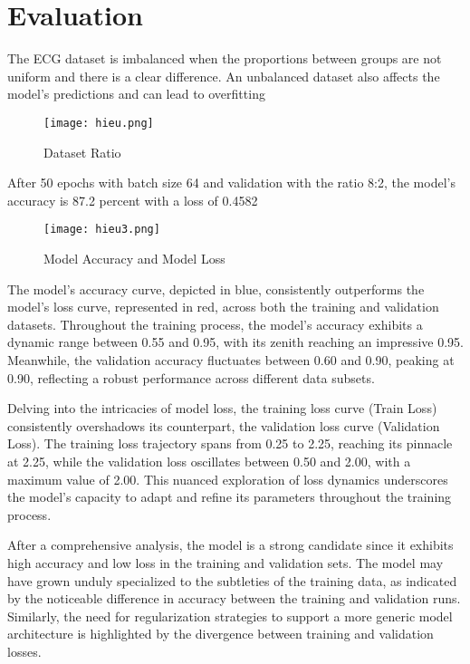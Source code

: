 \documentclass[conference]{IEEEtran}
\begin{document}
\section{Evaluation}

The ECG dataset is imbalanced when the proportions between groups are not uniform and there is a clear difference. An unbalanced dataset also affects the model's predictions and can lead to overfitting
\begin{figure}[h]
    \centering
    \texttt{[image: hieu.png]}
    \caption{Dataset Ratio}
    \label{fig1:hieu.png}
\end{figure}

After 50 epochs with batch size 64 and validation with the ratio 8:2, the model's accuracy is 87.2 percent with a loss of 0.4582
\begin{figure}[h]
    \centering
    \texttt{[image: hieu3.png]}
    \caption{Model Accuracy and Model Loss}
    \label{fig1:hieu.png}
\end{figure}

The model's accuracy curve, depicted in blue, consistently outperforms the model's loss curve, represented in red, across both the training and validation datasets. Throughout the training process, the model's accuracy exhibits a dynamic range between 0.55 and 0.95, with its zenith reaching an impressive 0.95. Meanwhile, the validation accuracy fluctuates between 0.60 and 0.90, peaking at 0.90, reflecting a robust performance across different data subsets.

Delving into the intricacies of model loss, the training loss curve (Train Loss) consistently overshadows its counterpart, the validation loss curve (Validation Loss). The training loss trajectory spans from 0.25 to 2.25, reaching its pinnacle at 2.25, while the validation loss oscillates between 0.50 and 2.00, with a maximum value of 2.00. This nuanced exploration of loss dynamics underscores the model's capacity to adapt and refine its parameters throughout the training process.

After a comprehensive analysis, the model is a strong candidate since it exhibits high accuracy and low loss in the training and validation sets. The model may have grown unduly specialized to the subtleties of the training data, as indicated by the noticeable difference in accuracy between the training and validation runs. Similarly, the need for regularization strategies to support a more generic model architecture is highlighted by the divergence between training and validation losses.
\end{document}

